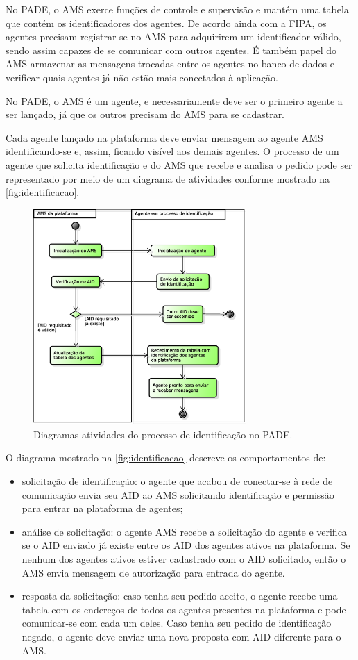 \documentclass[journal]{IEEEtran}
\begin{document}
No PADE, o AMS exerce funções de controle e supervisão e mantém uma tabela que contém os identificadores dos agentes. De acordo ainda com a FIPA, os agentes precisam registrar-se no AMS para adquirirem um identificador válido, sendo assim capazes de se comunicar com outros agentes. É também papel do AMS armazenar as mensagens trocadas entre os agentes no banco de dados e verificar quais agentes já não estão mais conectados à aplicação.

No PADE, o AMS é um agente, e necessariamente deve ser o primeiro agente a ser lançado, já que os outros precisam do AMS para se cadastrar. 

Cada agente lançado na plataforma deve enviar mensagem ao agente AMS identificando-se e, assim, ficando visível aos demais agentes. O processo de um agente que solicita identificação e do AMS que recebe e analisa o pedido pode ser representado por meio de um diagrama de atividades conforme mostrado na \autoref{fig:identificacao}.

\begin{figure}[!htb]
    \centering
    \includegraphics[width=3.2in]{Figuras/identificacao.eps}
    \caption{\label{fig:identificacao} Diagramas atividades do processo de identificação no PADE.}
\end{figure}

O diagrama mostrado na \autoref{fig:identificacao} descreve os comportamentos de:

\begin{itemize}
  \item solicitação de identificação: o agente que acabou de conectar-se à rede de comunicação envia seu AID ao AMS solicitando identificação e permissão para entrar na plataforma de agentes;
  \item análise de solicitação: o agente AMS recebe a solicitação do agente e verifica se o AID enviado já existe entre os AID dos agentes ativos na plataforma. Se nenhum dos agentes ativos estiver cadastrado com o AID solicitado, então o AMS envia mensagem de autorização para entrada do agente.
  \item resposta da solicitação: caso tenha seu pedido aceito, o agente recebe uma tabela com os endereços de todos os agentes presentes na plataforma e pode comunicar-se com cada um deles. Caso tenha seu pedido de identificação negado, o agente deve enviar uma nova proposta com AID diferente para o AMS.

\end{itemize}
\end{document}
